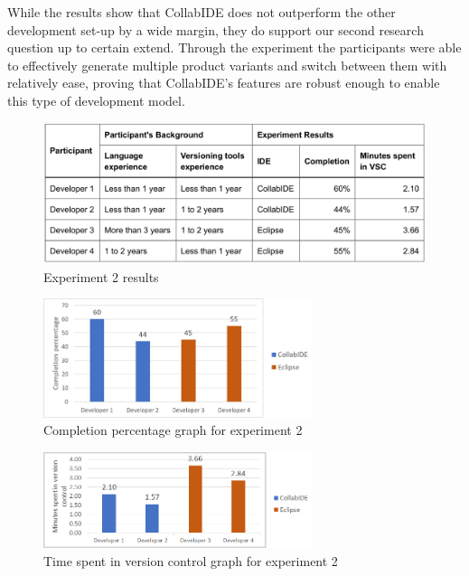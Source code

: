 While the results show that CollabIDE does not outperform the other development set-up by a wide 
margin, they do support our second research question up to certain extend. Through the experiment 
the participants were able to effectively generate multiple product variants and switch between them 
with relatively ease, proving that CollabIDE's features are robust enough to enable this type of 
development model.

\begin{figure}[htbp]
  \centering
  \includegraphics[width=1\textwidth]{img/resultsTableProductLine}
  \caption{Experiment 2 results}
  \label{fig:resultsTableProductLine}
\end{figure}

\begin{figure}[htbp]
  \centering
  \includegraphics[width=0.7\textwidth]{img/completionProductLine}
  \caption{Completion percentage graph for experiment 2}
  \label{fig:completionProductLine}
\end{figure}

\begin{figure}[htbp]
  \centering
  \includegraphics[width=0.7\textwidth]{img/versionControlProductLine}
  \caption{Time spent in version control graph for experiment 2}
  \label{fig:versionControlProductLine}
\end{figure}

